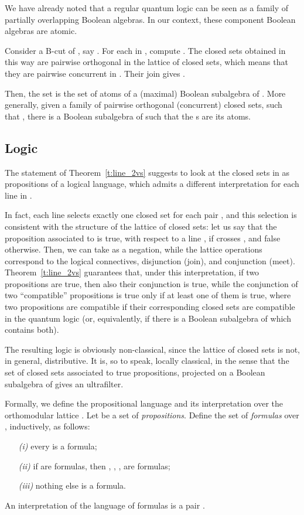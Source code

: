 \documentclass{eptcs}
\begin{document}
We have already noted that a regular quantum logic can be
seen as a family of partially overlapping Boolean algebras.
In our context, these component Boolean algebras are atomic.

Consider a B-cut of , say .
For each  in , compute .
The closed sets obtained in this way are pairwise orthogonal
in the lattice of closed sets, which means that they are
pairwise concurrent in . Their join gives .

Then, the set  is the
set of atoms of a (maximal) Boolean subalgebra of .
More generally, given a family  of pairwise
orthogonal (concurrent) closed sets, such that
, there is a Boolean
subalgebra of  such that the s are its atoms.
\subsection{Logic}\label{s:logica}
The statement of Theorem~\ref{t:line_2vs} suggests to look at
the closed sets in  as propositions of a logical language,
which admits a different interpretation for each line in .

In fact, each line selects exactly one closed set for each pair
, and this selection is consistent with the structure
of the lattice of closed sets: let us say that the proposition
associated to  is true, with respect to a line ,
if  crosses , and false otherwise.
Then, we can take  as a negation, while the lattice
operations correspond to the logical connectives, disjunction
(join), and conjunction (meet). Theorem~\ref{t:line_2vs}
guarantees that, under this interpretation, if two propositions
are true, then also their conjunction is true, while the
conjunction of two ``compatible'' propositions is true only
if at least one of them is true, where two propositions are
compatible if their corresponding closed sets are compatible
in the quantum logic  (or, equivalently, if there is
a Boolean subalgebra of  which contains both).

The resulting logic is obviously non-classical, since the lattice
of closed sets is not, in general, distributive. It is, so to
speak, locally classical, in the sense that the set of closed
sets associated to true propositions, projected on a Boolean
subalgebra of  gives an ultrafilter.

Formally, we define the propositional language 
and its interpretation over the orthomodular lattice .
Let  be a set of \emph{propositions}.
Define the set  of \emph{formulas} over , inductively,
as follows:
\begin{itemize}
  \item [\emph{(i)}] every  is a formula;
  \item [\emph{(ii)}] if  are formulas, then
        , , , 
        are formulas;
  \item [\emph{(iii)}] nothing else is a formula.
\end{itemize}
An interpretation of the language of formulas  is a pair
.
\end{document}
